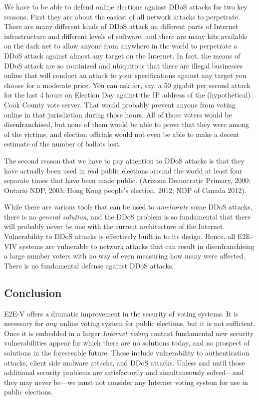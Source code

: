 We have to be able to defend online elections against DDoS attacks for
two key reasons.  First they are about the easiest of all network
attacks to perpetrate. There are many different kinds of DDoS attack
on different parts of Internet infrastructure and different levels of
software, and there are many kits available on the dark net to allow
anyone from anywhere in the world to perpetrate a DDoS attack against
almost any target on the Internet. In fact, the means of DDoS attack
are so routinized and ubiquitous that there are illegal businesses
online that will conduct an attack to your specifications against any
target you choose for a moderate price. You can ask for, say, a 50
gigabit per second attack for the last 4 hours on Election Day against
the IP address of the (hypothetical) Cook County vote server. That
would probably prevent anyone from voting online in that jurisdiction
during those hours. All of those voters would be disenfranchised, but
none of them would be able to prove that they were among of the
victims, and election officials would not even be able to make a
decent estimate of the number of ballots lost.

The second reason that we have to pay attention to DDoS attacks is
that they have actually been used in real public elections around the
world at least four separate times that have been made
public. (Arizona Democratic Primary, 2000; Ontario NDP, 2003; Hong
Kong people's election, 2012; NDP of Canada 2012).

While there are various tools that can be used to \emph{ameliorate}
some DDoS attacks, there is no \emph{general solution}, and the DDoS
problem is so fundamental that there will probably never be one with
the current architecture of the Internet. Vulnerability to DDoS
attacks is effectively built in to its design. Hence, all E2E-VIV
systems are vulnerable to network attacks that can result in
disenfranchising a large number voters with no way of even measuring
how many were affected. There is no fundamental defense against DDoS
attacks.

\subsection{Conclusion}

E2E-V offers a dramatic improvement in the security of voting
systems. It is necessary for \emph{any} online voting system for
public elections, but it is not sufficient. Once it is embedded in a
larger \emph{Internet voting} context fundamental new security
vulnerabilities appear for which there are no solutions today, and no
prospect of solutions in the foreseeable future. These include
vulnerability to authentication attacks, client side malware attacks,
and DDoS attacks. Unless and until those additional security problems
are satisfactorily and simultaneously solved---and they may never
be---we must not consider any Internet voting system for use in public
elections.

